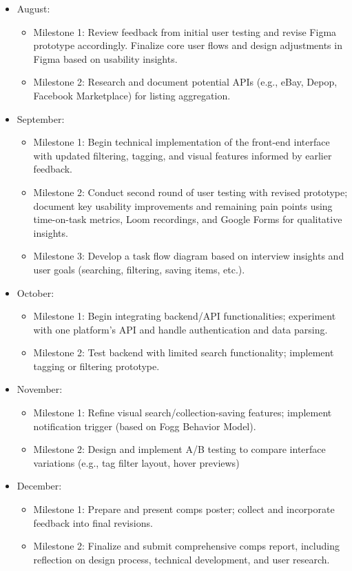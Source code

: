 \documentclass[10pt,twocolumn]{article}
\begin{document}
\begin{itemize}
    \item{August:}
    \begin{itemize}
        \item Milestone 1: Review feedback from initial user testing and revise Figma prototype accordingly. Finalize core user flows and design adjustments in Figma based on usability insights.
        \item Milestone 2: Research and document potential APIs (e.g., eBay, Depop, Facebook Marketplace) for listing aggregation.

    \end{itemize}
    \item {September:}
    \begin{itemize}
        \item Milestone 1: Begin technical implementation of the front-end interface  with updated filtering, tagging, and visual features informed by earlier feedback.
        \item Milestone 2: Conduct second round of user testing with revised prototype; document key usability improvements and remaining pain points using time-on-task metrics, Loom recordings, and Google Forms for qualitative insights.
        \item Milestone 3: Develop a task flow diagram based on interview insights and user goals (searching, filtering, saving items, etc.).

    \end{itemize}
    \item{October:}
    \begin{itemize}
        \item Milestone 1: Begin integrating backend/API functionalities; experiment with one platform’s API and handle authentication and data parsing.
        \item Milestone 2: Test backend with limited search functionality; implement tagging or filtering prototype.

    \end{itemize}
    \item {November:}
    \begin{itemize}
        \item Milestone 1: Refine visual search/collection-saving features; implement notification trigger (based on Fogg Behavior Model).
        \item Milestone 2: Design and implement A/B testing to compare interface variations (e.g., tag filter layout, hover previews)

    \end{itemize}
    \item{December:}
    \begin{itemize}
        \item Milestone 1: Prepare and present comps poster; collect and incorporate feedback into final revisions.
        \item Milestone 2: Finalize and submit comprehensive comps report, including reflection on design process, technical development, and user research.
    \end{itemize}
\end{itemize}
\end{document}
